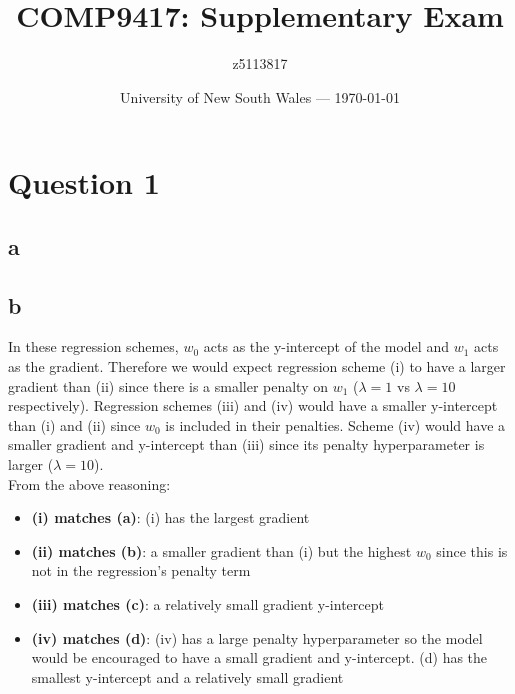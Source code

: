 \documentclass{article}
\title{COMP9417: Supplementary Exam} %
\author{z5113817} %
\date{University of New South Wales --- \today} %
\begin{document}




\section*{Question 1}

\subsection*{a}



\subsection*{b}

In these regression schemes, \(w_{0}\) acts as the y-intercept of the model and \(w_{1}\) acts as the gradient. Therefore we would expect 
regression scheme (i) to have a larger gradient than (ii) since there is a smaller penalty on \(w_{1}\) (\(\lambda = 1\) vs \(\lambda = 10\) respectively).
Regression schemes (iii) and (iv) would have a smaller y-intercept than (i) and (ii) since \(w_{0}\) is included in their penalties. Scheme (iv) would have 
a smaller gradient and y-intercept than (iii) since its penalty hyperparameter is larger (\(\lambda = 10\)).\\

From the above reasoning:
\begin{itemize}
    \item \textbf{(i) matches (a)}: (i) has the largest gradient
    \item \textbf{(ii) matches (b)}: a smaller gradient than (i) but the highest \(w_{0}\) since this is not in the regression's penalty term
    \item \textbf{(iii) matches (c)}: a relatively small gradient y-intercept
    \item \textbf{(iv) matches (d)}: (iv) has a large penalty hyperparameter so the model would be encouraged to have a small gradient and y-intercept. (d) has the smallest y-intercept and a relatively small gradient
\end{itemize}
\end{document}

